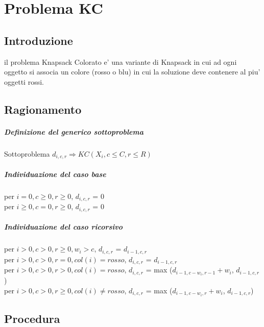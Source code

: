 \chapter{Problema KC}

\section{Introduzione}

il problema Knapsack Colorato e' una variante di Knapsack in cui ad ogni oggetto si associa un colore (rosso o blu) in cui la soluzione deve contenere al piu' oggetti rossi.

\section{Ragionamento}

\paragraph{Definizione del generico sottoproblema}
Sottoproblema $d_{i,c,r} \Rightarrow KC(X_i, c \leq C, r \leq R)$

\paragraph{Individuazione del caso base}

per $i = 0, c \geq 0, r \geq 0$, $d_{i,c,r}$ = 0 \\

per $i \geq 0, c = 0, r \geq 0$, $d_{i,c,r}$ = 0 \\

\paragraph{Individuazione del caso ricorsivo}

per $i > 0, c > 0, r \geq 0, w_i > c$, $d_{i,c,r}$ = $d_{i-1,c,r}$\\

per $i > 0, c > 0, r = 0, col(i) = rosso$, $d_{i,c,r}$ = $d_{i-1,c,r}$\\

per $i > 0, c > 0, r > 0, col(i) = rosso$, $d_{i,c,r}$ = max ($d_{i-1,c-w_i,r-1} + w_i$, $d_{i-1,c,r}$) \\

per $i > 0, c > 0, r \geq 0, col(i) \neq rosso$, $d_{i,c,r}$ = max ($d_{i-1,c-w_i,r} + w_i$, $d_{i-1,c,r}$) \\

\section{Procedura}

